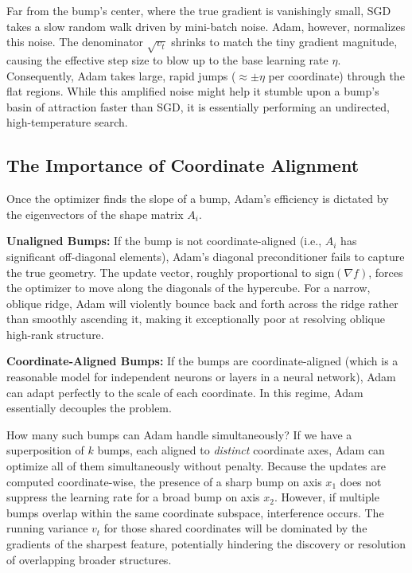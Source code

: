 \documentclass{article}
\begin{document}
Far from the bump's center, where the true gradient is vanishingly small, SGD takes a slow random walk driven by mini-batch noise. Adam, however, normalizes this noise. The denominator $\sqrt{v_t}$ shrinks to match the tiny gradient magnitude, causing the effective step size to blow up to the base learning rate $\eta$. Consequently, Adam takes large, rapid jumps ($\approx \pm \eta$ per coordinate) through the flat regions. While this amplified noise might help it stumble upon a bump's basin of attraction faster than SGD, it is essentially performing an undirected, high-temperature search.

\subsection{The Importance of Coordinate Alignment}

Once the optimizer finds the slope of a bump, Adam's efficiency is dictated by the eigenvectors of the shape matrix $A_i$.

\textbf{Unaligned Bumps:} If the bump is not coordinate-aligned (i.e., $A_i$ has significant off-diagonal elements), Adam's diagonal preconditioner fails to capture the true geometry. The update vector, roughly proportional to $\text{sign}(\nabla f)$, forces the optimizer to move along the diagonals of the hypercube. For a narrow, oblique ridge, Adam will violently bounce back and forth across the ridge rather than smoothly ascending it, making it exceptionally poor at resolving oblique high-rank structure.

\textbf{Coordinate-Aligned Bumps:} If the bumps are coordinate-aligned (which is a reasonable model for independent neurons or layers in a neural network), Adam can adapt perfectly to the scale of each coordinate. In this regime, Adam essentially decouples the problem. 

How many such bumps can Adam handle simultaneously? If we have a superposition of $k$ bumps, each aligned to \emph{distinct} coordinate axes, Adam can optimize all of them simultaneously without penalty. Because the updates are computed coordinate-wise, the presence of a sharp bump on axis $x_1$ does not suppress the learning rate for a broad bump on axis $x_2$. However, if multiple bumps overlap within the same coordinate subspace, interference occurs. The running variance $v_t$ for those shared coordinates will be dominated by the gradients of the sharpest feature, potentially hindering the discovery or resolution of overlapping broader structures.
\end{document}
